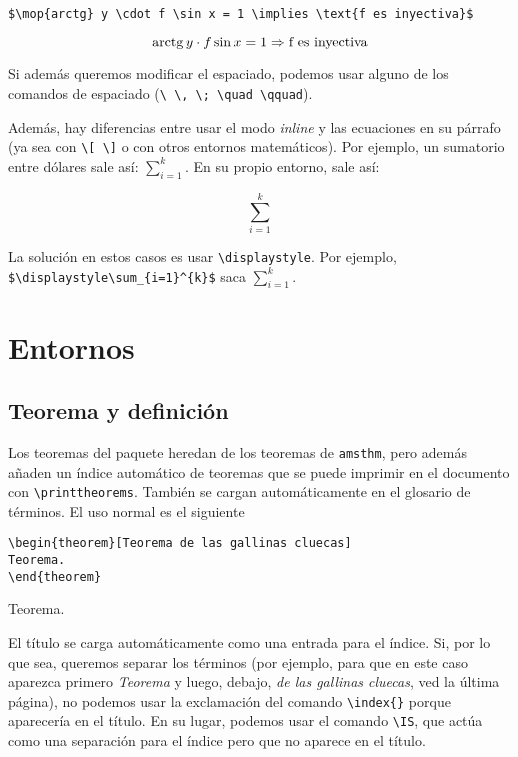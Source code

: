 \documentclass[nochap]{apuntes}
\begin{document}
\begin{center}
\verb|$\mop{arctg} y \cdot f \sin x = 1 \implies \text{f es inyectiva}$|
\end{center}

\[ \mathrm{arctg}\, y \cdot f \sin x = 1 \Rightarrow \text{f es inyectiva} \]

Si además queremos modificar el espaciado, podemos usar alguno de los comandos de espaciado (\verb|\ \, \; \quad \qquad|).

Además, hay diferencias entre usar el modo \textit{inline} y las ecuaciones en su párrafo (ya sea con \verb|\[ \]| o con otros entornos matemáticos). Por ejemplo, un sumatorio entre dólares sale así: $\sum_{i=1}^{k}$. En su propio entorno, sale así:

\[ \sum_{i=1}^{k} \]

La solución en estos casos es usar \verb|\displaystyle|. Por ejemplo, \verb|$\displaystyle\sum_{i=1}^{k}$| saca $\displaystyle\sum_{i=1}^{k}$. 

\section{Entornos}
\subsection{Teorema y definición}

Los teoremas del paquete heredan de los teoremas de \texttt{amsthm}, pero además añaden un índice automático de teoremas que se puede imprimir en el documento con \verb|\printtheorems|. También se cargan automáticamente en el glosario de términos. El uso normal es el siguiente

\begin{verbatim}
\begin{theorem}[Teorema de las gallinas cluecas]
Teorema.
\end{theorem}
\end{verbatim}

\begin{theorem}
Teorema.
\end{theorem}

El título se carga automáticamente como una entrada para el índice. Si, por lo que sea, queremos separar los términos (por ejemplo, para que en este caso aparezca primero \textit{Teorema} y luego, debajo, \textit{de las gallinas cluecas}, ved la última página), no podemos usar la exclamación del comando \verb|\index{}| porque aparecería en el título. En su lugar, podemos usar el comando \verb|\IS|, que actúa como una separación para el índice pero que no aparece en el título.
\end{document}
